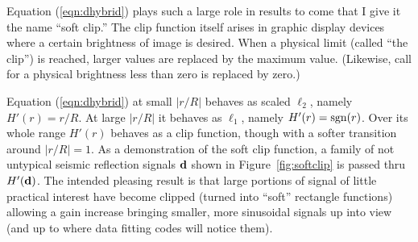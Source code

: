 \par
Equation (\ref{eqn:dhybrid}) plays such a large role in results to come
that I give it the name ``soft clip.''
The clip function itself arises in graphic display devices
where a certain brightness of image is desired.
When a physical limit (called ``the clip'')
is reached, larger values are replaced by the maximum value.
(Likewise, call for a physical brightness less than zero is replaced by zero.)

\par
{}

\par
Equation (\ref{eqn:dhybrid}) at small $|r/R|$ 
behaves as scaled $\ell_2$, namely $H'(r)=r/R$.
At large $|r/R|$ it behaves as $\ell_1$, namely $H'(r) = {\rm sgn}(r)$.
Over its whole range $H'(r)$ behaves as a clip function, though with a softer transition around $|r/R|=1$.
As a demonstration of the soft clip function, a family of not untypical seismic reflection signals $\bold d$
shown in Figure~\ref{fig:softclip} is passed thru $H'(\bold d)$.
The intended pleasing result is that large portions of signal of little practical interest
have become clipped (turned into ``soft'' rectangle functions)
allowing a gain increase bringing smaller, more sinusoidal signals up into view
(and up to where data fitting codes will notice them).


